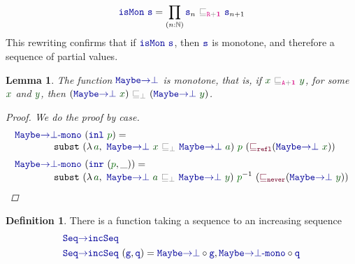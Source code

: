 \documentclass[twoside,11pt,openright]{report}
\theoremstyle{plain} %
\newtheorem{lem}[thm]{Lemma}
\theoremstyle{definition}
\newtheorem{defn}{Definition}[section]
\theoremstyle{remark}
\newcommand*{\term}[1]{\textcolor{green!30!black}{#1}} %
\newcommand*{\pathterm}[1]{\textcolor{green!40!black}{#1}}
\newcommand*{\type}[1]{\textcolor{magenta!90!black}{#1}}
\newcommand*{\unit}{\type{\textbf{1}}}
\newcommand*{\relation}[1]{\textcolor{gray}{\ensuremath{\mathtt{#1}}}}
\newcommand*{\function}[1]{\textcolor{blue!60!black}{\ensuremath{\mathtt{#1}}}}
\newcommand*{\constructor}[1]{\textcolor{purple!60!black}{\ensuremath{\mathtt{#1}}}}
\newcommand*{\sym}[1]{\ensuremath{#1^{-1}}}
\begin{document}
\begin{equation}
  \function{isMon}~\function{s} = \prod_{(n : \mathbb{N})} \function{s}_n~\relation{\sqsubseteq_{\type{R} + \unit}}~\function{s}_{n+1}
\end{equation}
This rewriting confirms that if \(\function{isMon}~\function{s}\), then \(\function{s}\) is monotone, and therefore a sequence of partial values.
\begin{lem}
  The function \(\function{Maybe{\rightarrow}\bot}\) is monotone, that is, if \(\term{x}~\relation{\sqsubseteq_{\type{A} + \unit}}~\term{y}\), for some \(\term{x}\) and \(\term{y}\), then \((\function{Maybe{\rightarrow}\bot}~\term{x})~\relation{\sqsubseteq_{\bot}}~(\function{Maybe{\rightarrow}\bot}~\term{y})\).
  \begin{proof}
    We do the proof by case.
    \begin{equation}
      \begin{aligned}
        &\function{Maybe{\rightarrow}\bot\text{-}mono}~(\function{inl}~\pathterm{p}) = \\[-1mm]
        &\qquad\qquad \mathtt{subst}~(\lambda\,\term{a},~\function{Maybe{\rightarrow}\bot}~\term{x}~\relation{\sqsubseteq_{\bot}}~\function{Maybe{\rightarrow}\bot}~\term{a})~\pathterm{p}~(\constructor{\sqsubseteq_{refl}} (\function{Maybe{\rightarrow}\bot}~\term{x})) \\[1mm]
        &\function{Maybe{\rightarrow}\bot\text{-}mono}~(\function{inr}~(\pathterm{p}, \_)) = \\[-1mm]
        &\qquad\qquad \mathtt{subst}~(\lambda\,\term{a},~\function{Maybe{\rightarrow}\bot}~\term{a}~\relation{\sqsubseteq_{\bot}}~\function{Maybe{\rightarrow}\bot}~\term{y})~\sym{\pathterm{p}}~(\constructor{\sqsubseteq_{never}} (\function{Maybe{\rightarrow}\bot}~\term{y}))
      \end{aligned}
    \end{equation}
  \end{proof}
\end{lem}
\begin{defn}
  There is a function taking a sequence to an increasing sequence 
  \begin{equation}
    \begin{aligned}
      &\function{Seq{\rightarrow}incSeq} \\
      &\function{Seq{\rightarrow}incSeq}~(\function{g} , \function{q}) = \function{Maybe{\rightarrow}\bot} \circ \function{g} , \function{Maybe{\rightarrow}\bot\text{-}mono} \circ \function{q}
    \end{aligned}
  \end{equation}
\end{defn}
\end{document}
